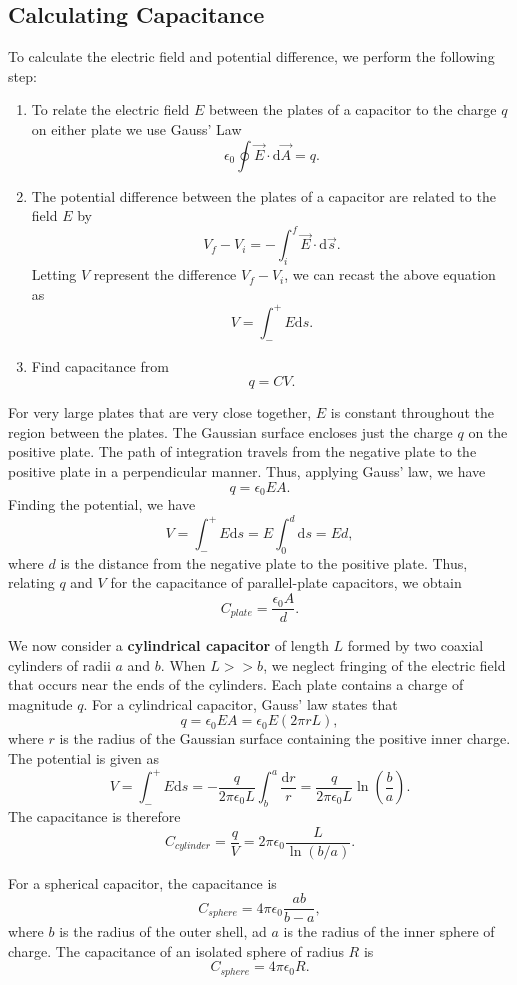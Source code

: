 \documentclass[11pt]{article}
\theoremstyle{plain} %
\theoremstyle{definition}
\theoremstyle{example}
\theoremstyle{remark}
\begin{document}
\subsection{Calculating Capacitance}

To calculate the electric field and potential difference, we perform the following step:
\begin{enumerate}
	\item To relate the electric field $E$ between the plates of a capacitor to the charge $q$ on either plate we use Gauss' Law $$\epsilon_0\oint\vec{E}\cdot \mathrm d \vec{A} = q.$$
	\item The potential difference between the plates of a capacitor are related to the field $E$ by
	$$V_f-V_i = -\int_i^f\vec{E} \cdot \mathrm d \vec{s}.$$
	Letting $V$ represent the difference $V_f-V_i$, we can recast the above equation as 
	$$V = \int_-^+E\mathrm d s.$$
	\item Find capacitance from $$q = CV.$$
\end{enumerate}

For very large plates that are very close together, $E$ is constant throughout the region between the plates. The Gaussian surface encloses just the charge $q$ on the positive plate. The path of integration travels from the negative plate to the positive plate in a perpendicular manner. Thus, applying Gauss' law, we have 
$$q = \epsilon_0EA.$$ Finding the potential, we have 
$$V = \int_-^+E\mathrm d s = E\int_0^d\mathrm d s = Ed,$$
where $d$ is the distance from the negative plate to the positive plate. Thus, relating $q$ and $V$ for the capacitance of parallel-plate capacitors, we obtain
$$ C_{plate} = \frac{\epsilon_0A}{d}.$$

We now consider a \textbf{cylindrical capacitor} of length $L$ formed by two coaxial cylinders of radii $a$ and $b$. When $L >> b$, we neglect fringing of the electric field that occurs near the ends of the cylinders. Each plate contains a charge of magnitude $q$. For a cylindrical capacitor, Gauss' law states that 
$$q = \epsilon_0EA = \epsilon_0E(2\pi rL),$$
where $r$ is the radius of the Gaussian surface containing the positive inner charge. The potential is given as 
$$V = \int_-^+E\mathrm d s = -\frac{q}{2\pi\epsilon_0L}\int_b^a\frac{\mathrm d r}{r} = \frac{q}{2\pi\epsilon_0L}\ln\left(\frac{b}{a}\right).$$
The capacitance is therefore 
$$C_{cylinder} = \frac{q}{V} = 2\pi\epsilon_0\frac{L}{\ln(b/a)}.$$

For a spherical capacitor, the capacitance is 
$$C_{sphere} = 4\pi\epsilon_0\frac{ab}{b-a},$$
where $b$ is the radius of the outer shell, ad $a$ is the radius of the inner sphere of charge. The capacitance of an isolated sphere of radius $R$ is 
$$C_{sphere} = 4\pi\epsilon_0R.$$
\end{document}
